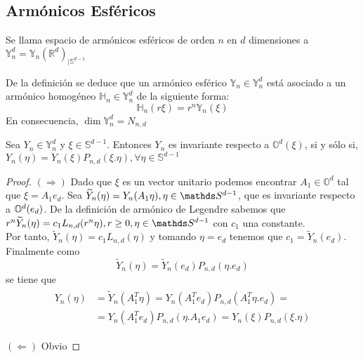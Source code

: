 \subsection{Armónicos Esféricos}
\begin{defn}
Se llama espacio de armónicos esféricos de orden $n$ en $d$ dimensiones a	$\mathds{Y}^d_n = \mathds{Y}_n(\mathds{R}^d)_{|\mathds{S}^{d-1}}$ 
\end{defn}
De la definición se deduce que un armónico esférico $\mathds{Y}_n \in \mathds{Y}^d_n$ está asociado a un armónico homogéneo $\mathds{H}_n \in \mathds{Y}^d_n$ de la siguiente forma:
$$
\mathds{H}_n(r\xi) = r^n\mathds{Y}_n(\xi)
$$
En consecuencia, $\dim \mathds{Y}^d_n= N_{n,d}$
\begin{thm}\label{thm:1}Sea ${Y}_n \in \mathds{Y}^d_n$ y $\xi\in\mathds{S}^{d-1}$. Entonces ${Y}_n$ es invariante respecto a $\mathbb{O}^d(\xi)$, si y sólo si, $Y_n(\eta)=Y_n(\xi)P_{n,d}(\xi.\eta), \forall \eta\in\mathds{S}^{d-1}$
\end{thm}
\begin{proof}
$(\Rightarrow)$ Dado que $\xi$ es un vector unitario podemos encontrar $A_1\in \mathds{O}^d$ tal que $\xi = A_1e_d$. Sea $\widetilde{Y}_n(\eta) = Y_n(A_1\eta),\eta\in\sphere$, que es invariante respecto a $\mathbb{O}^d(e_d)$. De la definición de armónico de Legendre sabemos que $r^n\widetilde{Y}_n(\eta) = c_1L_{n,d}(r^n\eta), r\ge0, \eta\in\sphere$ con $c_1$ una constante.\\
Por tanto, $\widetilde{Y}_n(\eta) = c_1 L_{n,d}(\eta)$ y tomando $\eta = e_d$ tenemos que $c_1 = \widetilde{Y}_n(e_d)$.
Finalmente como 
$$
\widetilde{Y}_n(\eta) = \widetilde{Y}_n(e_d)P_{n,d}(\eta.e_d)
$$
se tiene que
\begin{gather*}
\begin{aligned}
Y_n(\eta)&=\widetilde{Y}_n(A_1^T\eta)=Y_n(A_1^Te_d)P_{n,d}(A_1^T\eta.e_d)=\\&=Y_n(A_1^Te_d)P_{n,d}(\eta.A_1e_d) = Y_n(\xi)P_{n,d}(\xi.\eta)
\end{aligned}
\end{gather*}

$(\Leftarrow)$ Obvio
\end{proof}

